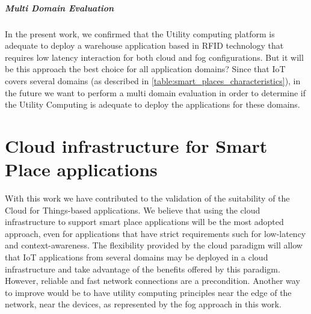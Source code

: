 \subparagraph{Multi Domain Evaluation}
\label{subp:multi_domain_evaluation}
In the present work, we confirmed that the Utility computing platform is adequate to deploy a
warehouse application based in RFID technology that requires low latency interaction for both cloud
and fog configurations. But it will be this approach the best choice for all application domains?
Since that IoT covers several domains (as described in \ref{table:smart_places_characteristics}), in
the future we want to perform a multi domain evaluation in order to determine if the Utility
Computing is adequate to deploy the applications for these domains.

\section{Cloud infrastructure for Smart Place applications}
\label{sec:conclusion_summary}
With this work we have contributed to the validation of the suitability of the Cloud for Things-based
applications. We believe that using the cloud infrastructure to support smart place applications will be the
most adopted approach, even for applications that have strict requirements such for low-latency
and context-awareness. The flexibility provided by the cloud paradigm will allow that
\gls{IoT} applications from several domains may be deployed in a cloud infrastructure and take
advantage of the benefits offered by this paradigm. However, reliable and fast network connections
are a precondition. Another way to improve would be to have utility computing principles near the
edge of the network, near the devices, as represented by the fog approach in this work.
